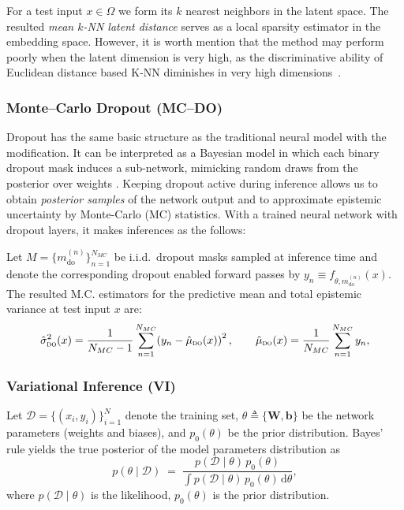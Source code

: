 \documentclass[preprint,12pt]{elsarticle}
\begin{document}
\noindent
For a test input $x\in\Omega$ we form its $k$ nearest neighbors in the latent space. The resulted \emph{mean $k$-NN latent distance} serves as a local sparsity estimator in the embedding space. However, it is worth mention that the method may perform poorly when the latent dimension is very high, as the discriminative ability of Euclidean distance based K-NN diminishes in very high dimensions~\cite{beyer1999nearest}.

\subsubsection{Monte–Carlo Dropout (MC--DO)}
\label{sec:sub:mc_do}
Dropout has the same basic structure as the traditional neural model with the modification. It can be interpreted as a Bayesian model in which each binary dropout mask induces a sub-network, mimicking random draws from the posterior over weights \cite{gal_dropout_2016}. Keeping dropout active during inference allows us to obtain \emph{posterior samples} of the network output and to approximate epistemic uncertainty by Monte-Carlo (MC) statistics. With a trained neural network with dropout layers, it makes inferences as the follows:

Let $M = {\{m_{\text{do}}^{(n)}\}_{n=1}^{N_{MC}}}$ be i.i.d.\ dropout masks sampled at inference time and denote the corresponding dropout enabled forward passes by $y_n \equiv f_{\theta,m_{\text{do}}^{(n)}}(x)$. The resulted M.C. estimators for the predictive mean and total epistemic variance at test input $x$ are:
\begin{equation}
    \hat\sigma^2_{\textsc{do}}(x)
    = \frac1{N_{MC}-1}\sum_{n=1}^{N_{MC}}\!\left(y_n-\hat\mu_{\textsc{do}}(x)\right)^2,
    \label{eq:do_mean_var}
    \qquad
    \hat\mu_{\textsc{do}}(x)
    = \frac1{N_{MC}}\sum_{n=1}^{N_{MC}} y_n,
\end{equation}


\subsubsection{Variational Inference (VI)}
\label{sec:sub:variational_inference}

Let $\mathcal D=\{(x_i,y_i)\}_{i=1}^{N}$ denote the training set, $\theta\triangleq\{\textbf{W},\textbf{b}\}$ be the network parameters (weights and biases), and $p_0(\theta)$ be the prior distribution. Bayes’ rule yields the true posterior of the model parameters distribution as
\begin{equation}
  p(\theta\mid\mathcal D)
  \;=\;
  \frac{p(\mathcal D\mid\theta)\,p_0(\theta)}
       {\int p(\mathcal D\mid\theta)\,p_0(\theta)\,\mathrm d\theta},
  \label{eq:posterior_exact}
\end{equation}
where $p(\mathcal D\mid\theta)$ is the likelihood, $p_0(\theta)$ is the prior distribution. 
\end{document}
